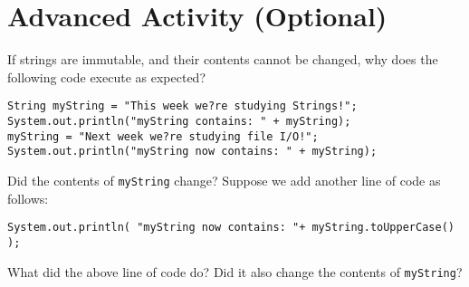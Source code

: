 \documentclass[12pt]{scrartcl}
\begin{document}
\section{Advanced Activity (Optional)}

If strings are immutable, and their contents cannot be changed, why does the 
following code execute as expected?  

\begin{verbatim}
String myString = "This week we?re studying Strings!"; 
System.out.println("myString contains: " + myString);
myString = "Next week we?re studying file I/O!";
System.out.println("myString now contains: " + myString);
\end{verbatim}

Did the contents of \texttt{myString} change?
Suppose we add another line of code as follows:

\texttt{System.out.println( "myString now contains: "+ myString.toUpperCase() );}

What did the above line of code do?  Did it also change the contents 
of \texttt{myString}?
\end{document}
